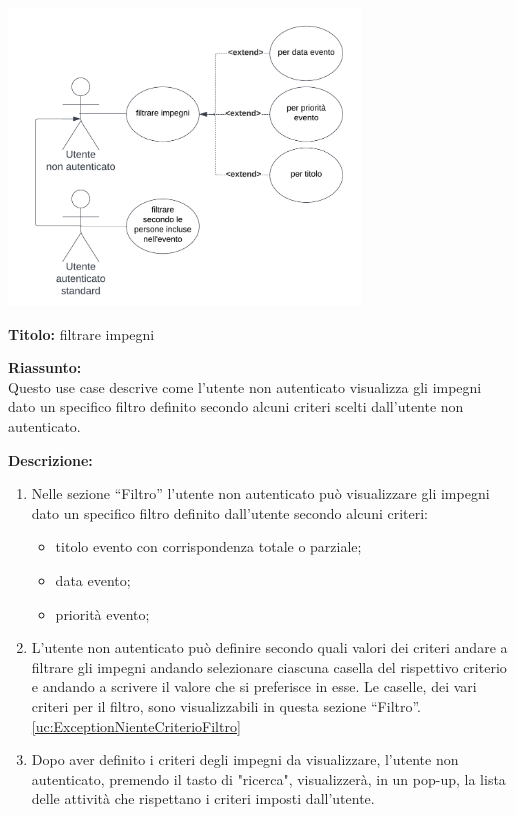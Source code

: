 \begin{listaPersonale}[UC]{}
    \newpage


    \begin{center}
        \includegraphics[width=0.7\textwidth]{img/Diagrammi/UseCases/Filtro.png}
    \end{center}
    \begin{listaPersonale2}[UC] {}
    \textbf{Titolo:} filtrare impegni

    \textbf{Riassunto:} \\
    Questo use case descrive come l'utente non autenticato visualizza gli impegni dato un specifico filtro definito secondo alcuni criteri scelti dall'utente non autenticato.

    \textbf{Descrizione:}
    \begin{enumerate}
        \item Nelle sezione “Filtro” l'utente non autenticato può visualizzare gli impegni dato un specifico filtro definito dall'utente secondo alcuni criteri:
              \begin{itemize}
                  \item titolo evento con corrispondenza totale o parziale;
                  \item data evento;
                  \item priorità evento;
              \end{itemize}

        \item L'utente non autenticato può definire secondo quali valori dei criteri andare a filtrare gli impegni andando selezionare ciascuna casella del rispettivo criterio e andando a scrivere il valore che si preferisce in esse. Le caselle, dei vari criteri per il filtro, sono visualizzabili in questa sezione “Filtro”. \ref{uc:ExceptionNienteCriterioFiltro}
        \item Dopo aver definito i criteri degli impegni da visualizzare, l'utente non autenticato, premendo il tasto di "ricerca", visualizzerà, in un pop-up, la lista delle attività che rispettano i criteri imposti dall'utente.
    \end{enumerate}


\end{listaPersonale2}
\end{listaPersonale}
